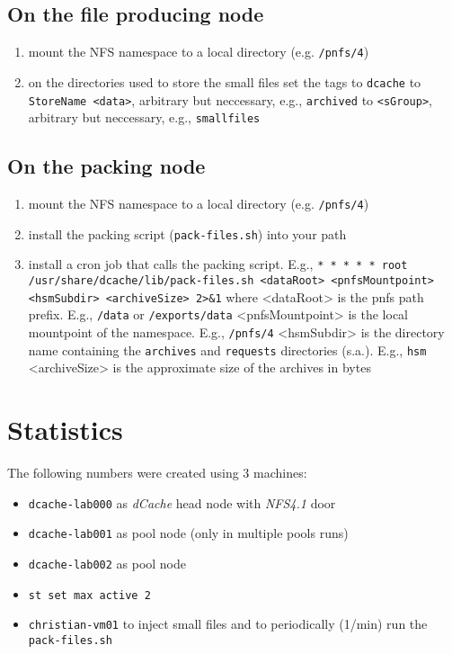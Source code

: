 \documentclass[a4paper,8pt]{scrartcl}
\begin{document}
\subsection{On the file producing node}
\begin{enumerate}
  \item mount the NFS namespace to a local directory (e.g. \texttt{/pnfs/4})
  \item on the directories used to store the small files set the tags
     to \texttt{dcache}
     to \texttt{StoreName <data>}, arbitrary but neccessary, e.g., \texttt{archived}
     to \texttt{<sGroup>}, arbitrary but neccessary, e.g., \texttt{smallfiles}
\end{enumerate}

\subsection{On the packing node}
\begin{enumerate}
  \item mount the NFS namespace to a local directory (e.g. \texttt{/pnfs/4})
  \item install the packing script (\texttt{pack-files.sh}) into your path
  \item install a cron job that calls the packing script. E.g., 
    \subitem \texttt{*  *  *  *  * root /usr/share/dcache/lib/pack-files.sh <dataRoot> <pnfsMountpoint> <hsmSubdir> <archiveSize> 2>\&1}
    \subitem where <dataRoot> is the pnfs path prefix. E.g., \texttt{/data} or \texttt{/exports/data}
    \subitem <pnfsMountpoint> is the local mountpoint of the namespace. E.g., \texttt{/pnfs/4}
    \subitem <hsmSubdir> is the directory name containing the \texttt{archives} and \texttt{requests} directories (s.a.). E.g., \texttt{hsm}
    \subitem <archiveSize> is the approximate size of the archives in bytes
\end{enumerate}

\section{Statistics}
The following numbers were created using 3 machines:
\begin{itemize}
  \item \texttt{dcache-lab000} as \emph{dCache} head node with \emph{NFS4.1} door
  \item \texttt{dcache-lab001} as pool node (only in multiple pools runs)
  \item \texttt{dcache-lab002} as pool node
  \item \texttt{st set max active 2}
  \item \texttt{christian-vm01} to inject small files and to periodically (1/min) run the \texttt{pack-files.sh}
\end{itemize}
\end{document}
